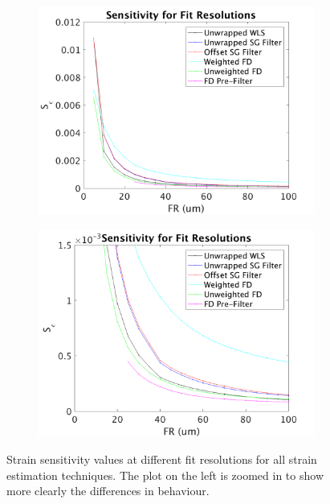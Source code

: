 \begin{figure}[b!]
	\centering
    \begin{subfigure}{0.49\textwidth}
    	\centering
        \includegraphics[width=\textwidth]{figures/sensitivity_lr0.png}
    \end{subfigure}
    \begin{subfigure}{0.49\textwidth}
    	\centering
        \includegraphics[width=\textwidth]{figures/sensitivity_lr0_zoom.png}
    \end{subfigure}
    \label{sensitivity_1}
    \caption{Strain sensitivity values at different fit resolutions for all strain estimation techniques. The plot on the left is zoomed in to show more clearly the differences in behaviour.}
\end{figure}

